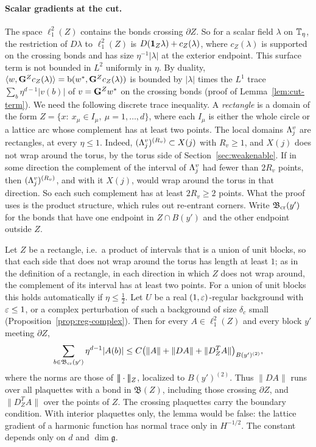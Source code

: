 \paragraph{Scalar gradients at the cut.} The space $\ell^2_1(Z)$ contains the bonds crossing $\partial Z$. So for a scalar field $\lambda$ on $\mathbb T_\eta$, the restriction of $D\lambda$ to $\ell^2_1(Z)$ is $D(\mathbf 1_Z\lambda)+c_Z(\lambda)$, where $c_Z(\lambda)$ is supported on the crossing bonds and has size $\eta^{-1}|\lambda|$ at the exterior endpoint. This surface term is not bounded in $L^2$ uniformly in $\eta$. By duality, $\langle w,\mathbf G^Zc_Z(\lambda)\rangle=\mathrm b(w^*,\mathbf G^Zc_Z(\lambda))$ is bounded by $|\lambda|$ times the $L^1$ trace $\sum_b\eta^{d-1}|v(b)|$ of $v=\mathbf G^Zw^*$ on the crossing bonds (proof of Lemma~\ref{lem:cut-term}). We need the following discrete trace inequality. A \emph{rectangle} is a domain of the form $Z=\{x:\ x_\mu\in I_\mu,\ \mu=1,\dots,d\}$, where each $I_\mu$ is either the whole circle or a lattice arc whose complement has at least two points. The local domains $\Lambda^v_j$ are rectangles, at every $\eta\le1$. Indeed, $(\Lambda^v_j)^{(R_v)}\subset X(j)$ with $R_v\ge1$, and $X(j)$ does not wrap around the torus, by the torus side of Section~\ref{sec:weakenable}. If in some direction the complement of the interval of $\Lambda^v_j$ had fewer than $2R_v$ points, then $(\Lambda^v_j)^{(R_v)}$, and with it $X(j)$, would wrap around the torus in that direction. So each such complement has at least $2R_v\ge2$ points. What the proof uses is the product structure, which rules out re-entrant corners. Write $\mathfrak B_{\rm cr}(y')$ for the bonds that have one endpoint in $Z\cap B(y')$ and the other endpoint outside $Z$.

\begin{lemma}\label{lem:trace}
Let $Z$ be a rectangle, i.e.\ a product of intervals that is a union of unit blocks, so that each side that does not wrap around the torus has length at least $1$; as in the definition of a rectangle, in each direction in which $Z$ does not wrap around, the complement of its interval has at least two points. For a union of unit blocks this holds automatically if $\eta\le\frac12$. Let $U$ be a real $(1,\varepsilon)$-regular background with $\varepsilon\le1$, or a complex perturbation of such a background of size $\delta_c$ small (Proposition~\ref{prop:reg-complex}). Then for every $A\in\ell^2_1(Z)$ and every block $y'$ meeting $\partial Z$,
\[
\sum_{b\in\mathfrak B_{\rm cr}(y')}\eta^{d-1}|A(b)|\le C\big(\|A\|+\|DA\|+\|D^T_ZA\|\big)_{B(y')^{(2)}},
\]
where the norms are those of $|\!|\!|\cdot|\!|\!|_Z$, localized to $B(y')^{(2)}$. Thus $\|DA\|$ runs over all plaquettes with a bond in $\mathfrak B(Z)$, including those crossing $\partial Z$, and $\|D^T_ZA\|$ over the points of $Z$. The crossing plaquettes carry the boundary condition. With interior plaquettes only, the lemma would be false: the lattice gradient of a harmonic function has normal trace only in $H^{-1/2}$. The constant depends only on $d$ and $\dim\mathfrak g$.
\end{lemma}

